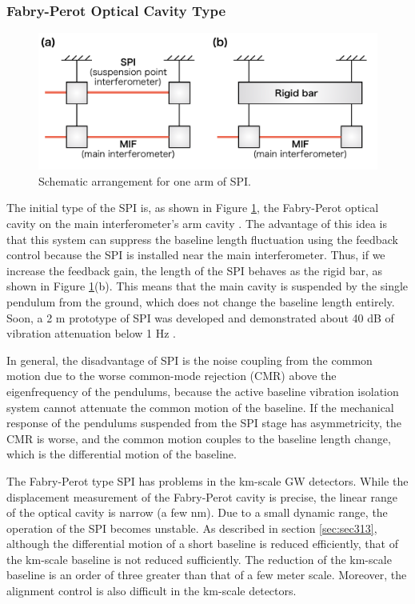 \subsubsection{Fabry-Perot Optical Cavity Type }
\begin{figure}[h]
  \begin{center}   
    \includegraphics[width=13cm]{./img_chap5/img508.png}
    \caption{Schematic arrangement for one arm of SPI.} \label{img:img508}
  \end{center}
\end{figure}
The initial type of the SPI is, as shown in Figure \ref{img:img508}, the Fabry-Perot optical cavity on the main interferometer's arm cavity \cite{drever2002extension}. The advantage of this idea is that this system can suppress the baseline length fluctuation using the feedback control because the SPI is installed near the main interferometer. Thus, if we increase the feedback gain, the length of the SPI behaves as the rigid bar, as shown in Figure \ref{img:img508}(b). This means that the main cavity is suspended by the single pendulum from the ground, which does not change the baseline length entirely. Soon, a 2 m prototype of SPI was developed and demonstrated about 40 dB of vibration attenuation below 1 Hz \cite{aso2004stabilization}.

In general, the disadvantage of SPI is the noise coupling from the common motion due to the worse common-mode rejection (CMR) above the eigenfrequency of the pendulums, because the active baseline vibration isolation system cannot attenuate the common motion of the baseline. If the mechanical response of the pendulums suspended from the SPI stage has asymmetricity, the CMR is worse, and the common motion couples to the baseline length change, which is the differential motion of the baseline.

The Fabry-Perot type SPI has problems in the km-scale GW detectors. While the displacement measurement of the Fabry-Perot cavity is precise, the linear range of the optical cavity is narrow (a few nm). Due to a small dynamic range, the operation of the SPI becomes unstable. As described in section \cref{sec:sec313}, although the differential motion of a short baseline is reduced efficiently, that of the km-scale baseline is not reduced sufficiently. The reduction of the km-scale baseline is an order of three greater than that of a few meter scale. Moreover, the alignment control is also difficult in the km-scale detectors.

